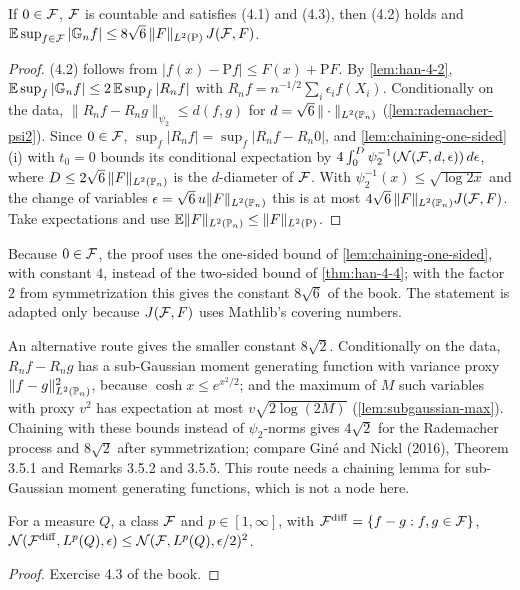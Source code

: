 \begin{theorem}
  \label{thm:han-4-9}
  If $0\in\mathcal{F}$, $\mathcal{F}$ is countable and satisfies (4.1) and (4.3), then (4.2) holds and
  $\mathbb{E}\sup_{f\in\mathcal{F}}|\mathbb{G}_n f|\le8\sqrt6\,\|F\|_{L^2(\mathrm P)}\,J(\mathcal{F},F)$.
\end{theorem}
\begin{proof}
  (4.2) follows from $|f(x)-\mathrm Pf|\le F(x)+\mathrm PF$. By \cref{lem:han-4-2}, $\mathbb{E}\sup_f|\mathbb{G}_n f|\le2\,\mathbb{E}\sup_f|R_nf|$ with $R_nf=n^{-1/2}\sum_i\epsilon_if(X_i)$. Conditionally on the data, $\|R_nf-R_ng\|_{\psi_2}\le d(f,g)$ for $d=\sqrt6\,\|\cdot\|_{L^2(\mathbb{P}_n)}$ (\cref{lem:rademacher-psi2}). Since $0\in\mathcal{F}$, $\sup_f|R_nf|=\sup_f|R_nf-R_n0|$, and \cref{lem:chaining-one-sided}(i) with $t_0=0$ bounds its conditional expectation by $4\int_0^{D}\psi_2^{-1}(\mathcal{N}(\mathcal{F},d,\epsilon))\,d\epsilon$, where $D\le2\sqrt6\,\|F\|_{L^2(\mathbb{P}_n)}$ is the $d$-diameter of $\mathcal{F}$. With $\psi_2^{-1}(x)\le\sqrt{\log2x}$ and the change of variables $\epsilon=\sqrt6\,u\|F\|_{L^2(\mathbb{P}_n)}$ this is at most $4\sqrt6\,\|F\|_{L^2(\mathbb{P}_n)}J(\mathcal{F},F)$. Take expectations and use $\mathbb{E}\|F\|_{L^2(\mathbb{P}_n)}\le\|F\|_{L^2(\mathrm P)}$.
\end{proof}
\begin{remark}
  Because $0\in\mathcal{F}$, the proof uses the one-sided bound of \cref{lem:chaining-one-sided}, with constant $4$, instead of the two-sided bound of \cref{thm:han-4-4}; with the factor $2$ from symmetrization this gives the constant $8\sqrt6$ of the book. The statement is adapted only because $J(\mathcal{F},F)$ uses Mathlib's covering numbers.
\end{remark}
\begin{remark}
  An alternative route gives the smaller constant $8\sqrt2$. Conditionally on the data, $R_nf-R_ng$ has a sub-Gaussian moment generating function with variance proxy $\|f-g\|_{L^2(\mathbb{P}_n)}^2$, because $\cosh x\le e^{x^2/2}$; and the maximum of $M$ such variables with proxy $v^2$ has expectation at most $v\sqrt{2\log(2M)}$ (\cref{lem:subgaussian-max}). Chaining with these bounds instead of $\psi_2$-norms gives $4\sqrt2$ for the Rademacher process and $8\sqrt2$ after symmetrization; compare Gin\'e and Nickl (2016), Theorem 3.5.1 and Remarks 3.5.2 and 3.5.5. This route needs a chaining lemma for sub-Gaussian moment generating functions, which is not a node here.
\end{remark}

\begin{lemma}
  \label{lem:han-4-3}
  For a measure $Q$, a class $\mathcal{F}$ and $p\in[1,\infty]$, with $\mathcal{F}^{\mathrm{diff}}=\{f-g:f,g\in\mathcal{F}\}$,
  $\mathcal{N}(\mathcal{F}^{\mathrm{diff}},L^p(Q),\epsilon)\le\mathcal{N}(\mathcal{F},L^p(Q),\epsilon/2)^2$.
\end{lemma}
\begin{proof}
  Exercise 4.3 of the book.
\end{proof}


